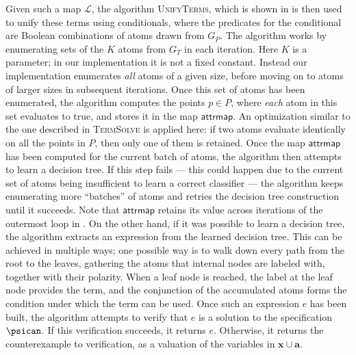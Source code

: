 Given such a map $\mathcal{L}$, the algorithm \textsc{UnifyTerms},
which is shown in  is then used to unify these
terms using conditionals, where the predicates for the conditional are
Boolean combinations of atoms drawn from $G_P$. The algorithm works by
enumerating sets of the $K$ atoms from $G_T$ in each iteration. Here
$K$ is a parameter; in our implementation it is not a fixed
constant. Instead our implementation enumerates \emph{all} atoms of a
given size, before moving on to atoms of larger sizes in subsequent
iterations. Once this set of atoms has been enumerated, the algorithm
computes the points $p \in P$, where \emph{each} atom in this set
evaluates to true, and stores it in the map
$\mathsf{attrmap}$. An optimization similar to the one described
in \textsc{TermSolve} is applied here: if two atoms evaluate
identically on all the points in $P$, then only one of them is
retained. Once the map $\mathsf{attrmap}$ has been computed for
the current batch of atoms, the algorithm then attempts to learn a
decision tree. If this step fails --- this could happen due to the
current set of atoms being insufficient to learn a correct classifier
--- the algorithm keeps enumerating more ``batches'' of atoms and
retries the decision tree construction until it succeeds. Note that
$\mathsf{attrmap}$ retains its value across iterations of the
outermost loop in . On the other hand, if it was
possible to learn a decision tree, the algorithm extracts an
expression from the learned decision tree. This can be achieved in
multiple ways; one possible way is to walk down every path from the
root to the leaves, gathering the atoms that internal nodes are
labeled with, together with their polarity. When a leaf node is
reached, the label at the leaf node provides the term, and the
conjunction of the accumulated atoms forms the condition under which
the term can be used. Once such an expression $e$ has been built, the
algorithm attempts to verify that $e$ is a solution to the \sygusbody
specification $\psican$. If this verification succeeds, it returns
$e$. Otherwise, it returns the counterexample to verification, as a
valuation of the variables in $\mathbf{x} \cup \mathbf{a}$.

